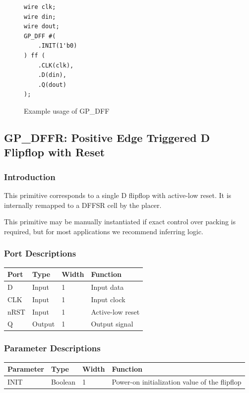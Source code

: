 \documentclass[11pt]{article}
\begin{document}
\begin{figure}[h]
\begin{lstlisting}
wire clk;
wire din;
wire dout;
GP_DFF #(
	.INIT(1'b0)
) ff (
	.CLK(clk),
	.D(din),
	.Q(dout)
);
\end{lstlisting}
\caption{Example usage of GP\_DFF}
\label{gp-dff-example}
\end{figure}


\pagebreak
\subsection{GP\_DFFR: Positive Edge Triggered D Flipflop with Reset}

\subsubsection{Introduction}
This primitive corresponds to a single D flipflop with active-low reset. It is internally remapped to a DFFSR cell by 
the placer.

This primitive may be manually instantiated if exact control over packing is required, but for most applications we 
recommend inferring logic.

\subsubsection{Port Descriptions}

\begin{tabularx}{4in}{|l|l|l|X|}
\hline
{\bfseries Port} & {\bfseries Type} & {\bfseries Width} & {\bfseries Function} \\
\hline
D & Input & 1 & Input data \\
\hline
CLK & Input & 1 & Input clock \\
\hline
nRST & Input & 1 & Active-low reset \\
\hline
Q & Output & 1 & Output signal \\
\hline
\end{tabularx}

\subsubsection{Parameter Descriptions}

\begin{tabularx}{5in}{|l|l|l|X|}
\hline
{\bfseries Parameter} & {\bfseries Type} & {\bfseries Width} & {\bfseries Function} \\
\hline
INIT & Boolean & 1 & Power-on initialization value of the flipflop \\
\hline
\end{tabularx}
\end{document}
